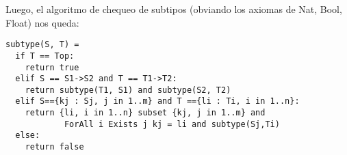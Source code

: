 Luego, el algoritmo de chequeo de subtipos (obviando los axiomas de Nat, Bool, Float) nos queda:

\begin{verbatim}
subtype(S, T) =
  if T == Top:
    return true
  elif S == S1->S2 and T == T1->T2:
    return subtype(T1, S1) and subtype(S2, T2)
  elif S=={kj : Sj, j in 1..m} and T =={li : Ti, i in 1..n}:
    return {li, i in 1..n} subset {kj, j in 1..m} and
            ForAll i Exists j kj = li and subtype(Sj,Ti)
  else:
    return false
\end{verbatim}
